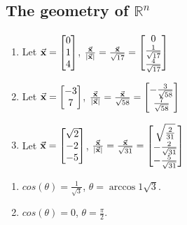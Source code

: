 \subsection{The geometry of $\mathbb{R}^n$}

\begin{exercise}{3}
  \begin{enumerate}
    \item Let $\vec{\mathbf{x}} = \begin{bmatrix}0\\1\\4\end{bmatrix}$,
          $\frac{\vec{\mathbf{x}}}{|\vec{\mathbf{x}}|}=
           \frac{\vec{\mathbf{x}}}{\sqrt{17}}=
           \begin{bmatrix}0\\\frac{1}{\sqrt{17}}\\\frac{4}{\sqrt{17}}\end{bmatrix}$

    \item Let $\vec{\mathbf{x}} = \begin{bmatrix}-3\\7\end{bmatrix}$,
          $\frac{\vec{\mathbf{x}}}{|\vec{\mathbf{x}}|}=
           \frac{\vec{\mathbf{x}}}{\sqrt{58}}=
           \begin{bmatrix}-\frac{3}{\sqrt{58}}\\\frac{7}{\sqrt{58}}\end{bmatrix}$

    \item Let $\vec{\mathbf{x}} = \begin{bmatrix}\sqrt{2}\\-2\\-5\end{bmatrix}$,
          $\frac{\vec{\mathbf{x}}}{|\vec{\mathbf{x}}|}=
           \frac{\vec{\mathbf{x}}}{\sqrt{31}}=
           \begin{bmatrix}
             \sqrt{\frac{2}{31}} \\
             -\frac{2}{\sqrt{31}} \\
             -\frac{5}{\sqrt{31}}
           \end{bmatrix}$
  \end{enumerate}
\end{exercise}

\begin{exercise}{5}
  \begin{enumerate}
    \item $cos(\theta) = \frac{1}{\sqrt{3}}$, $\theta = \arccos{1}{\sqrt{3}}$.
    \item $cos(\theta) = 0$, $\theta = \frac{\pi}{2}$.
  \end{enumerate}
\end{exercise}

